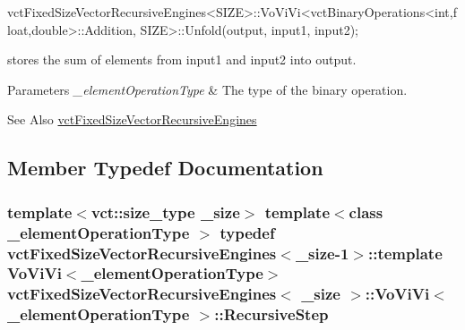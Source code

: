 \begin{DoxyPre}vctFixedSizeVectorRecursiveEngines<SIZE>::VoViVi<vctBinaryOperations<int,float,double>::Addition, SIZE>::Unfold(output, input1, input2);
\end{DoxyPre}
 stores the sum of elements from input1 and input2 into output.


\begin{DoxyParams}{Parameters}
{\em \-\_\-element\-Operation\-Type} & The type of the binary operation.\\
\hline
\end{DoxyParams}
\begin{DoxySeeAlso}{See Also}
\hyperlink{classvct_fixed_size_vector_recursive_engines}{vct\-Fixed\-Size\-Vector\-Recursive\-Engines} 
\end{DoxySeeAlso}


\subsection{Member Typedef Documentation}
\hypertarget{classvct_fixed_size_vector_recursive_engines_1_1_vo_vi_vi_ab2721312ef2322e61092499ea592bef5}{
\subsubsection[{Recursive\-Step}]{\setlength{\rightskip}{0pt plus 5cm}template$<$vct\-::size\-\_\-type \-\_\-size$>$ template$<$class \-\_\-element\-Operation\-Type $>$ typedef {\bf vct\-Fixed\-Size\-Vector\-Recursive\-Engines}$<$\-\_\-size-\/1$>$\-::template {\bf Vo\-Vi\-Vi}$<$\-\_\-element\-Operation\-Type$>$ {\bf vct\-Fixed\-Size\-Vector\-Recursive\-Engines}$<$ \-\_\-size $>$\-::{\bf Vo\-Vi\-Vi}$<$ \-\_\-element\-Operation\-Type $>$\-::{\bf Recursive\-Step}}}\label{classvct_fixed_size_vector_recursive_engines_1_1_vo_vi_vi_ab2721312ef2322e61092499ea592bef5}


